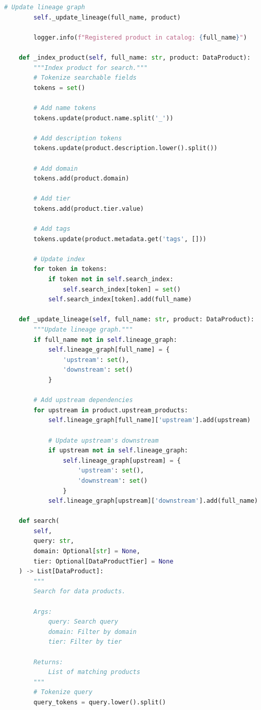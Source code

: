 \begin{lstlisting}[language=Python, caption={Federated Catalog for Cross-Domain Discovery}]
        # Update lineage graph
        self._update_lineage(full_name, product)

        logger.info(f"Registered product in catalog: {full_name}")

    def _index_product(self, full_name: str, product: DataProduct):
        """Index product for search."""
        # Tokenize searchable fields
        tokens = set()

        # Add name tokens
        tokens.update(product.name.split('_'))

        # Add description tokens
        tokens.update(product.description.lower().split())

        # Add domain
        tokens.add(product.domain)

        # Add tier
        tokens.add(product.tier.value)

        # Add tags
        tokens.update(product.metadata.get('tags', []))

        # Update index
        for token in tokens:
            if token not in self.search_index:
                self.search_index[token] = set()
            self.search_index[token].add(full_name)

    def _update_lineage(self, full_name: str, product: DataProduct):
        """Update lineage graph."""
        if full_name not in self.lineage_graph:
            self.lineage_graph[full_name] = {
                'upstream': set(),
                'downstream': set()
            }

        # Add upstream dependencies
        for upstream in product.upstream_products:
            self.lineage_graph[full_name]['upstream'].add(upstream)

            # Update upstream's downstream
            if upstream not in self.lineage_graph:
                self.lineage_graph[upstream] = {
                    'upstream': set(),
                    'downstream': set()
                }
            self.lineage_graph[upstream]['downstream'].add(full_name)

    def search(
        self,
        query: str,
        domain: Optional[str] = None,
        tier: Optional[DataProductTier] = None
    ) -> List[DataProduct]:
        """
        Search for data products.

        Args:
            query: Search query
            domain: Filter by domain
            tier: Filter by tier

        Returns:
            List of matching products
        """
        # Tokenize query
        query_tokens = query.lower().split()


\end{lstlisting}
